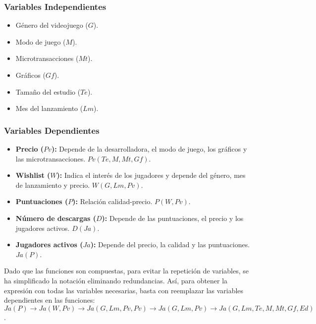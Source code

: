 \documentclass[titlepage,a4paper]{article}
\begin{document}
\subsubsection{Variables Independientes}
\begin{itemize}
    \item Género del videojuego ($G$).
    \item Modo de juego ($M$).
    \item Microtransacciones ($Mt$). 
    \item Gráficos ($Gf$).
    \item Tamaño del estudio ($Te$).
    \item Mes del lanzamiento ($Lm$). \\
\end{itemize}

\subsubsection{Variables Dependientes}
\begin{itemize}
    \item \textbf{Precio ($Pv$):} Depende de la desarrolladora, el modo de juego, los gráficos y las microtransacciones. $Pv(Te, M, Mt, Gf)$. \\
    
    \item \textbf{Wishlist ($W$):} Indica el interés de los jugadores y depende del género, mes de lanzamiento y precio. $W(G, Lm, Pv)$. \\
    
    \item \textbf{Puntuaciones ($P$):} Relación calidad-precio. $P(W, Pv)$. \\
    
    \item \textbf{Número de descargas ($D$):} Depende de las puntuaciones, el precio y los jugadores activos. $D(Ja)$. \\
    
    \item \textbf{Jugadores activos ($Ja$):} Depende del precio, la calidad y las puntuaciones. $Ja(P)$. \\
\end{itemize}

Dado que las funciones son compuestas, para evitar la repetición de variables, se ha simplificado la notación eliminando redundancias. Así, para obtener la expresión con todas las variables necesarias, basta con reemplazar las variables dependientes en las funciones: $Ja(P) \rightarrow Ja(W, Pv) \rightarrow Ja(G, Lm, Pv, Pv) \rightarrow Ja(G, Lm, Pv) \rightarrow Ja(G, Lm, Te, M, Mt, Gf, Ed)$. \\
\end{document}
